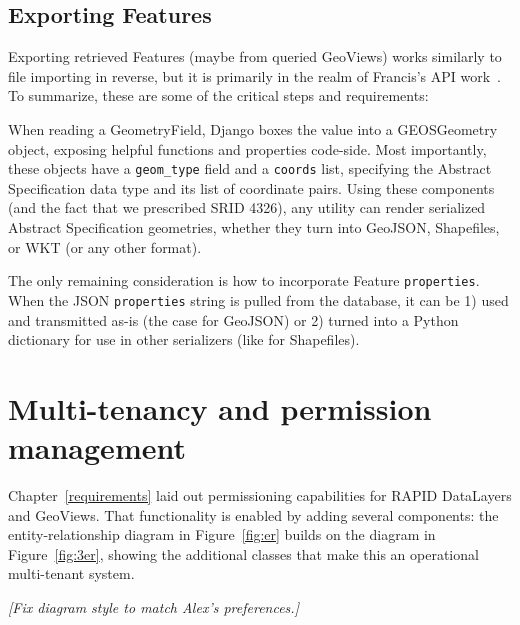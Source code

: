 \subsection{Exporting Features}
\label{sec:export}
Exporting retrieved Features (maybe from queried GeoViews) works similarly to file importing in reverse, but it is primarily in the realm of Francis's API work~\cite{Francis}. To summarize, these are some of the critical steps and requirements:

When reading a GeometryField, Django boxes the value into a GEOSGeometry object, exposing helpful functions and properties code-side. Most importantly, these objects have a \texttt{geom\_type} field and a \texttt{coords} list, specifying the Abstract Specification data type and its list of coordinate pairs. Using these components (and the fact that we prescribed SRID 4326), any utility can render serialized Abstract Specification geometries, whether they turn into GeoJSON, Shapefiles, or WKT (or any other format).

The only remaining consideration is how to incorporate Feature \texttt{properties}. When the JSON \texttt{properties} string is pulled from the database, it can be 1) used and transmitted as-is (the case for GeoJSON) or 2) turned into a Python dictionary for use in other serializers (like for Shapefiles).


\section{Multi-tenancy and permission management}
Chapter~\ref{requirements} laid out permissioning capabilities for RAPID DataLayers and GeoViews. That functionality is enabled by adding several components: the entity-relationship diagram in Figure~\ref{fig:er} builds on the diagram in Figure~\ref{fig:3er}, showing the additional classes that make this an operational multi-tenant system.

\textit{[Fix diagram style to match Alex's preferences.]}

